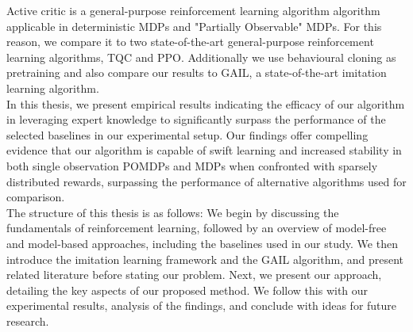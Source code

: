 Active critic is a general-purpose reinforcement learning algorithm algorithm applicable in deterministic MDPs and "Partially Observable" MDPs. 
For this reason, we compare it to two state-of-the-art general-purpose reinforcement learning algorithms, TQC and PPO. Additionally we use behavioural cloning as pretraining  
and also compare our results to GAIL, a state-of-the-art imitation learning algorithm.\\
In this thesis, we present empirical results indicating the efficacy of our algorithm in leveraging expert knowledge to significantly surpass the performance of the selected baselines in our 
experimental setup. Our findings offer compelling evidence that our algorithm is capable of swift learning and increased stability in both single observation POMDPs and MDPs when confronted with 
sparsely distributed rewards, surpassing the performance of alternative algorithms used for comparison.\\

The structure of this thesis is as follows: We begin by discussing the fundamentals of reinforcement learning, followed by an overview of model-free and model-based approaches, 
including the baselines used in our study. We then introduce the imitation learning framework and the GAIL algorithm, and present related literature before stating our problem. 
Next, we present our approach, detailing the key aspects of our proposed method. We follow this with our experimental results, analysis of the findings, and conclude with ideas for future research.